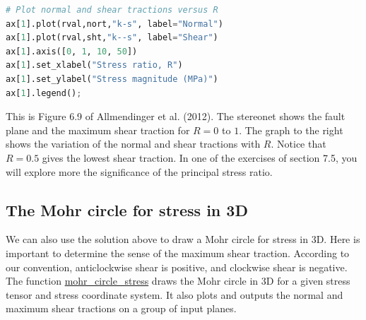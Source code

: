 \documentclass[a4paper , 12pt]{book}
\begin{document}
\begin{center}
\begin{lstlisting}[language=Python, frame=single]
# Plot normal and shear tractions versus R
ax[1].plot(rval,nort,"k-s", label="Normal")
ax[1].plot(rval,sht,"k--s", label="Shear")
ax[1].axis([0, 1, 10, 50])
ax[1].set_xlabel("Stress ratio, R")
ax[1].set_ylabel("Stress magnitude (MPa)")
ax[1].legend();
\end{lstlisting}
\end{center}

This is Figure 6.9 of Allmendinger et al. (2012). The stereonet shows the fault plane and the maximum shear traction for $R=0$ to $1$. The graph to the right shows the variation of the normal and shear tractions with $R$. Notice that $R=0.5$ gives the lowest shear traction. In one of the exercises of section 7.5, you will explore more the significance of the principal stress ratio.

\subsection{The Mohr circle for stress in 3D}\label{3DMohrCircle}

We can also use the solution above to draw a Mohr circle for stress in 3D. Here is important to determine the sense of the maximum shear traction. According to our convention, anticlockwise shear is positive, and clockwise shear is negative. The function \href{https://github.com/nfcd/compGeo/blob/master/source/functions/mohr_circle_stress.py}{mohr\_circle\_stress} draws the Mohr circle in 3D for a given stress tensor and stress coordinate system. It also plots and outputs the normal and maximum shear tractions on a group of input planes.
\end{document}
